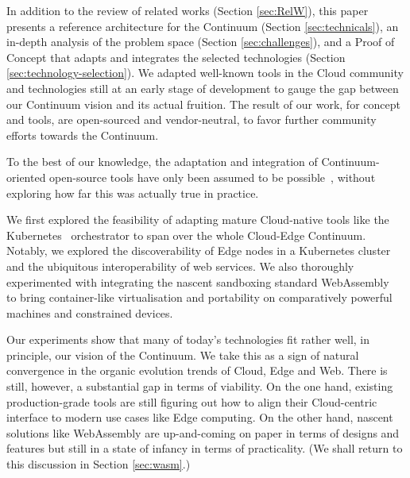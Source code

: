 In addition to the review of related works (Section \ref{sec:RelW}), this paper presents a reference architecture for the Continuum (Section \ref{sec:technicals}), an in-depth analysis of the problem space (Section \ref{sec:challenges}), and a  Proof of Concept that adapts and integrates the selected technologies (Section \ref{sec:technology-selection}). 
We adapted well-known tools in the Cloud community and technologies still at an early stage of development to gauge the gap between our Continuum vision and its actual fruition. 
The result of our work, for concept and tools, are open-sourced and vendor-neutral, to favor further community efforts towards the Continuum.

To the best of our knowledge, the adaptation and integration of Continuum-oriented open-source tools have only been assumed to be possible~\cite{menetrey2022webassembly}, without exploring how far this was actually true in practice. 

We first explored the feasibility of adapting mature Cloud-native tools like the Kubernetes~\cite{kubernetes} orchestrator to span over the whole Cloud-Edge Continuum. Notably, we explored the discoverability of Edge nodes in a Kubernetes cluster and the ubiquitous interoperability of web services. We also thoroughly experimented with integrating the nascent sandboxing standard WebAssembly~\cite{haas2017bringing} to bring container-like virtualisation and portability on comparatively powerful machines and constrained devices. 

Our experiments show that many of today's technologies fit rather well, in principle, our vision of the Continuum. We take this as a sign of natural convergence in the organic evolution trends of Cloud, Edge and Web. There is still, however, a substantial gap in terms of viability. On the one hand, existing production-grade tools are still figuring out how to align their Cloud-centric interface to modern use cases like Edge computing. On the other hand, nascent solutions like WebAssembly are up-and-coming on paper in terms of designs and features but still in a state of infancy in terms of practicality. (We shall return to this discussion in Section \ref{sec:wasm}.)



